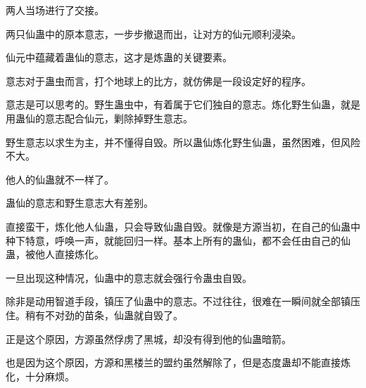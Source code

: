 \begin{this_body}
两人当场进行了交接。

两只仙蛊中的原本意志，一步步撤退而出，让对方的仙元顺利浸染。

仙元中蕴藏着蛊仙的意志，这才是炼蛊的关键要素。

意志对于蛊虫而言，打个地球上的比方，就仿佛是一段设定好的程序。

意志是可以思考的。野生蛊虫中，有着属于它们独自的意志。炼化野生仙蛊，就是用蛊仙的意志配合仙元，剿除掉野生意志。

野生意志以求生为主，并不懂得自毁。所以蛊仙炼化野生仙蛊，虽然困难，但风险不大。

他人的仙蛊就不一样了。

蛊仙的意志和野生意志大有差别。

直接蛮干，炼化他人仙蛊，只会导致仙蛊自毁。就像是方源当初，在自己的仙蛊中种下特意，呼唤一声，就能回归一样。基本上所有的蛊仙，都不会任由自己的仙蛊，被他人直接炼化。

一旦出现这种情况，仙蛊中的意志就会强行令蛊虫自毁。

除非是动用智道手段，镇压了仙蛊中的意志。不过往往，很难在一瞬间就全部镇压住。稍有不对劲的苗条，仙蛊就自毁了。

正是这个原因，方源虽然俘虏了黑城，却没有得到他的仙蛊暗箭。

也是因为这个原因，方源和黑楼兰的盟约虽然解除了，但是态度蛊却不能直接炼化，十分麻烦。

\end{this_body}

